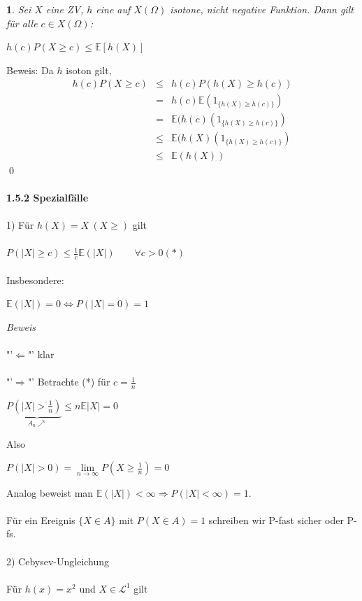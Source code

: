 \documentclass[10pt,a4paper]{report}
\numberwithin{equation}{section}
\numberwithin{figure}{section}
\theoremstyle{plain}
\theoremstyle{definition}
\theoremstyle{plain}
\newtheorem{prop}{\protect\propositionname}[section]
\theoremstyle{definition}
\theoremstyle{remark}
\theoremstyle{plain}
\theoremstyle{plain}
\theoremstyle{plain}
\theoremstyle{plain}
\theoremstyle{plain}
\providecommand{\propositionname}{Satz}
\newcommand{\1}{ \mathbb{1} } %
\begin{document}
\begin{prop}
  Sei $X$ eine ZV, $h$ eine auf $X(\Omega)$ isotone, nicht negative
  Funktion. Dann gilt für alle $c \in X(\Omega)$:
  \begin{center}
    $h(c)P(X\geq c) \leq \mathbb{E}[h(X)]$
  \end{center}
\end{prop}
Beweis:	Da $h$ isoton gilt,
\begin{eqnarray*}
h(c)P(X\geq c) &\leq & h(c)P(h(X)\geq h(c))\\
&=& h(c) \mathbb{E}(1_{\{h(X)\geq h(c)\}})\\
&=& \mathbb{E}(h(c)(1_{\{h(X)\geq h(c)\}})\\
&\leq &\mathbb{E}(h(X)(1_{\{h(X)\geq h(c)\}})\\
&\leq &\mathbb{E}(h(X))
\end{eqnarray*}\qed\\\\
\textbf{1.5.2 Spezialfälle}\\\\
1) Für $h(X)=X ~(X\geq)$ gilt\\\\
$P(|X|\geq c) \leq \frac{1}{c}\mathbb{E}(|X|) \qquad \forall c >0 (*)$\\\\
Insbesondere:
\begin{center}
$\mathbb{E}(|X|)=0 \Leftrightarrow P(|X|=0)=1 $
\end{center}
\textit{Beweis}\\\\
"'$\Leftarrow$"' klar\\\\
"'$\Rightarrow$"' Betrachte (*) für $c=\frac{1}{n}$
\begin{center}
$P\underbrace{\left(|X|>\frac{1}{n}\right)}_{A_n\nearrow} \leq n\mathbb{E}|X|=0$
\end{center}
Also
\begin{center}
$P(|X|>0)=\lim\limits_{n \to \infty}P\left(X\geq \frac{1}{n}\right)=0$
\end{center}
Analog beweist man $\mathbb{E}(|X|)<\infty \Rightarrow P(|X|<\infty)=1$.\\\\
Für ein Ereignis $\{X\in A\}$ mit $P(X \in A)=1$ schreiben wir P-fast sicher oder P-fs.\\\\
2) Cebysev-Ungleichung\\\\
Für $h(x)=x^2$ und $X \in \mathcal{L}^1$ gilt 
\end{document}
